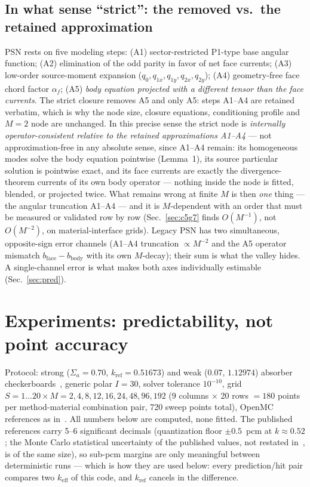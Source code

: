 \documentclass[11pt,a4paper]{article}
\begin{document}
\subsection{In what sense ``strict'': the removed vs.\ the retained
approximation}
\label{sec:sense}
PSN rests on five modeling steps: (A1) sector-restricted P1-type base
angular function; (A2) elimination of the odd parity in favor of net
face currents; (A3) low-order source-moment expansion
($q_0,q_{1x},q_{1y},q_{2x},q_{2y}$); (A4) geometry-free face chord
factor $\alpha_f$; (A5) \emph{body equation projected with a different
tensor than the face currents}.  The strict closure removes A5 and
only A5: steps A1--A4 are retained verbatim, which is why the node
size, closure equations, conditioning profile and $M{=}2$ node are
unchanged.  In this precise sense the strict node is
\emph{internally operator-consistent relative to the retained
approximations A1--A4} --- not approximation-free in any absolute
sense, since A1--A4 remain: its homogeneous modes solve the body equation pointwise
(Lemma~1), its source particular solution is pointwise exact, and its
face currents are exactly the divergence-theorem currents of its own
body operator --- nothing inside the node is fitted, blended, or
projected twice.  What remains wrong at finite $M$ is then
\emph{one} thing --- the angular truncation A1--A4 --- and it is
$M$-dependent with an order that must be measured or validated row by
row (Sec.~\ref{sec:c5g7} finds $O(M^{-1})$, not $O(M^{-2})$, on
material-interface grids).  Legacy PSN has two simultaneous,
opposite-sign error channels (A1--A4 truncation $\propto M^{-2}$ and
the A5 operator mismatch $b_\mathrm{face}{-}b_\mathrm{body}$ with its
own $M$-decay); their sum is what the valley hides.  A single-channel
error is what makes both axes individually estimable
(Sec.~\ref{sec:pred}).

\section{Experiments: predictability, not point accuracy}
\label{sec:exp}

Protocol: strong ($\Sigma_a=0.70$, $k_{\mathrm{ref}}=0.51673$) and weak
($0.07$, $1.12974$) absorber checkerboards~\cite{chao2027}, generic
polar $I=30$, solver tolerance $10^{-10}$, grid
$S=1\ldots20 \times M=2,4,8,12,16,24,48,96,192$ (9 columns $\times$
20 rows $=180$ points per method-material combination pair, 720
sweep points total), OpenMC references as in~\cite{chao2027}.  All
numbers below are computed, none fitted.  The published references
carry 5--6 significant decimals (quantization floor $\pm0.5$~pcm at
$k\approx0.52$; the Monte Carlo statistical uncertainty of the
published values, not restated in~\cite{chao2027}, is of the same
size), so sub-pcm margins are only meaningful between deterministic
runs --- which is how they are used below: every prediction/hit pair
compares two $k_{\mathrm{eff}}$ of this code, and $k_{\mathrm{ref}}$
cancels in the difference.
\end{document}
